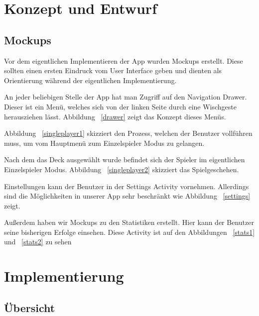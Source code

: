 \documentclass{scrartcl}
\begin{document}
\section{Konzept und Entwurf}
\subsection{Mockups}
Vor dem eigentlichen Implementieren der App wurden Mockups erstellt. Diese
sollten einen ersten Eindruck vom User Interface geben und dienten als
Orientierung während der eigentlichen Implementierung.

An jeder beliebigen Stelle der App hat man Zugriff auf den Navigation Drawer.
Dieser ist ein Menü, welches sich von der linken Seite durch eine Wischgeste
herausziehen lässt. Abbildung ~\ref{drawer} zeigt das Konzept dieses Menüs.

Abbildung ~\ref{singleplayer1} skizziert den Prozess, welchen der Benutzer
vollführen muss, um vom Hauptmenü zum Einzelspieler Modus zu gelangen.

Nach dem das Deck ausgewählt wurde befindet sich der Spieler im eigentlichen
Einzelspieler Modus. Abbildung ~\ref{singleplayer2} skizziert das
Spielgeschehen.

Einstellungen kann der Benutzer in der Settings Activity vornehmen. Allerdings
sind die Möglichkeiten in unserer App sehr beschränkt wie Abbildung
~\ref{settings} zeigt.

Außerdem haben wir Mockups zu den Statistiken erstellt. Hier kann der Benutzer
seine bisherigen Erfolge einsehen. Diese Activity ist auf den Abbildungen
~\ref{stats1} und ~\ref{stats2} zu sehen


\newpage

\section{Implementierung}
\subsection{Übersicht}
\end{document}
